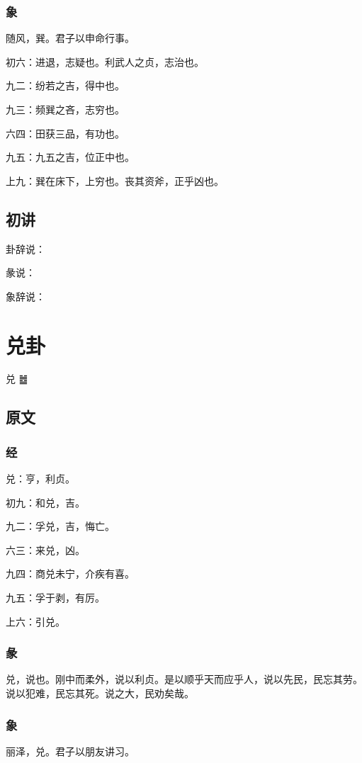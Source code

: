 \documentclass[12pt,oneside]{book}
\begin{document}
\subsection{象}
随风，巽。君子以申命行事。

初六：进退，志疑也。利武人之贞，志治也。

九二：纷若之吉，得中也。

九三：频巽之吝，志穷也。

六四：田获三品，有功也。

九五：九五之吉，位正中也。

上九：巽在床下，上穷也。丧其资斧，正乎凶也。

\section{初讲}
卦辞说：

彖说：

象辞说：


\chapter{兑卦}
兑 {\Large ䷹}

\section{原文}

\subsection{经}
兑：亨，利贞。

初九：和兑，吉。

九二：孚兑，吉，悔亡。

六三：来兑，凶。

九四：商兑未宁，介疾有喜。

九五：孚于剥，有厉。

上六：引兑。

\subsection{彖}
兑，说也。刚中而柔外，说以利贞。是以顺乎天而应乎人，说以先民，民忘其劳。说以犯难，民忘其死。说之大，民劝矣哉。

\subsection{象}
丽泽，兑。君子以朋友讲习。
\end{document}
